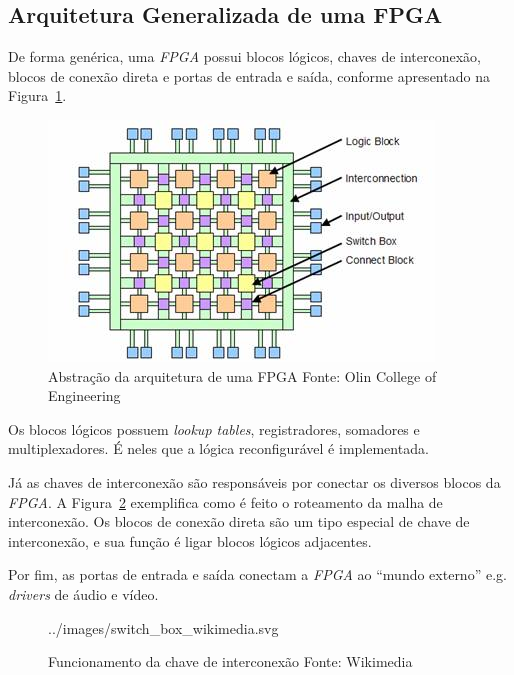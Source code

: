     \subsection{Arquitetura Generalizada de uma FPGA}
    {
        De forma genérica, uma \textit{FPGA} possui blocos lógicos, chaves de
        interconexão, blocos de conexão direta e portas de entrada e saída,
        conforme apresentado na Figura~\ref{fig:fpga_general_arch}.
    }

    \begin{figure}[H]
    \centering
    \includegraphics[width=.7\linewidth]
        {../images/fpga_architecture_abstraction_-_olin_college.jpg}
        \caption[Abstração da arquitetura de uma FPGA]
            {Abstração da arquitetura de uma FPGA \quad Fonte: Olin College of
                Engineering}\label{fig:fpga_general_arch}
    \end{figure}

    {
        Os blocos lógicos possuem \textit{lookup tables}, registradores, somadores
        e multiplexadores. É neles que a lógica reconfigurável é implementada.
    }

    {
        Já as chaves de interconexão são responsáveis por conectar os diversos
        blocos da \textit{FPGA}. A Figura~\ref{fig:fpga_switch_box} exemplifica
        como é feito o roteamento da malha de interconexão. Os blocos de conexão
        direta são um tipo especial de chave de interconexão, e sua função é ligar
        blocos lógicos adjacentes.
    }

    {
        Por fim, as portas de entrada e saída conectam a \textit{FPGA} ao ``mundo
        externo'' e.g. \textit{drivers} de áudio e vídeo.
    }

    \begin{figure}[H]
    \centering
    
        {../images/switch_box_wikimedia.svg}
        \caption[Funcionamento da chave de interconexão]
            {Funcionamento da chave de interconexão \quad Fonte: Wikimedia
            }\label{fig:fpga_switch_box}
    \end{figure}


